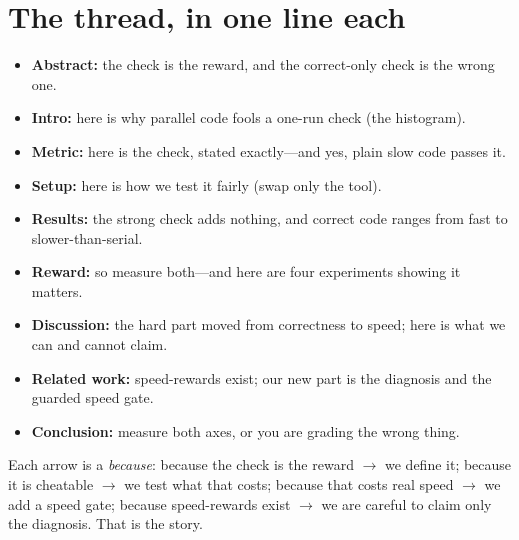 \documentclass[11pt]{article}
\begin{document}
\section*{The thread, in one line each}
\begin{itemize}
\item \textbf{Abstract:} the check is the reward, and the correct-only check is the wrong
  one.
\item \textbf{Intro:} here is why parallel code fools a one-run check (the histogram).
\item \textbf{Metric:} here is the check, stated exactly---and yes, plain slow code passes
  it.
\item \textbf{Setup:} here is how we test it fairly (swap only the tool).
\item \textbf{Results:} the strong check adds nothing, and correct code ranges from fast
  to slower-than-serial.
\item \textbf{Reward:} so measure both---and here are four experiments showing it matters.
\item \textbf{Discussion:} the hard part moved from correctness to speed; here is what we
  can and cannot claim.
\item \textbf{Related work:} speed-rewards exist; our new part is the diagnosis and the
  guarded speed gate.
\item \textbf{Conclusion:} measure both axes, or you are grading the wrong thing.
\end{itemize}

Each arrow is a \emph{because}: because the check is the reward $\rightarrow$ we define it;
because it is cheatable $\rightarrow$ we test what that costs; because that costs real
speed $\rightarrow$ we add a speed gate; because speed-rewards exist $\rightarrow$ we are
careful to claim only the diagnosis. That is the story.
\end{document}
